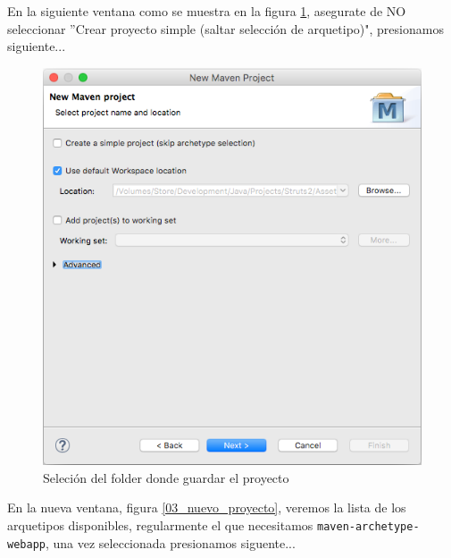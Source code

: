 \documentclass[12pt,a4paper]{article}
\begin{document}
		En la siguiente ventana como se muestra en la figura \ref{02_nuevo_proyecto}, asegurate de NO seleccionar ''Crear proyecto simple (saltar selecci\'on de arquetipo)", presionamos siguiente...\\ \par
        \begin{figure}[h]
            \centering
            \includegraphics[scale=0.4]{02_nuevo_proyecto}
            \caption{Seleci\'on del folder donde guardar el proyecto}
            \label{02_nuevo_proyecto}
        \end{figure}
        En la nueva ventana, figura \ref{03_nuevo_proyecto}, veremos la lista de los arquetipos disponibles, regularmente el que necesitamos \texttt{maven-archetype-webapp}, una vez seleccionada presionamos siguente...\\ \par
\end{document}
